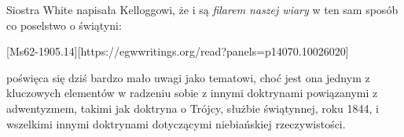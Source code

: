 Siostra White napisała Kelloggowi, że  i  są \textit{filarem naszej wiary} w ten sam sposób co poselstwo o świątyni:

[Ms62-1905.14][https://egwwritings.org/read?panels=p14070.10026020]

 poświęca się dziś bardzo mało uwagi jako tematowi, choć jest ona jednym z kluczowych elementów w radzeniu sobie z innymi doktrynami powiązanymi z adwentyzmem, takimi jak doktryna o Trójcy, służbie świątynnej, roku 1844, i wszelkimi innymi doktrynami dotyczącymi niebiańskiej rzeczywistości.

